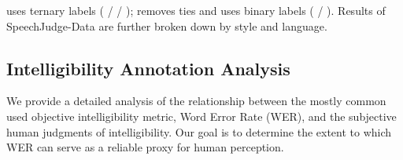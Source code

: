 \documentclass[]{bytedance_seed}
\newcommand{\note}[1]{\textcolor{blue}{{#1}}}
\begin{document}
\begin{table}[t]
{\begin{threeparttable}
\begin{tabular}{l|c|cc|ccc|c}
    \bottomrule
\end{tabular}
\begin{tablenotes}
    \footnotesize{
        \item[*] { uses ternary labels ( /  / );  removes ties and uses binary labels ( / ). Results of SpeechJudge-Data are further broken down by style and language.}
    }
\end{tablenotes}
\vspace{-4mm}
\end{threeparttable}  
}
\end{table}



\subsection{Intelligibility Annotation Analysis}
\label{app:analysis-intelligibility}


We provide a detailed analysis of the relationship between the mostly common used objective intelligibility metric, Word Error Rate (WER), and the subjective human judgments of intelligibility. Our goal is to determine the extent to which WER can serve as a reliable proxy for human perception.

\end{document}
